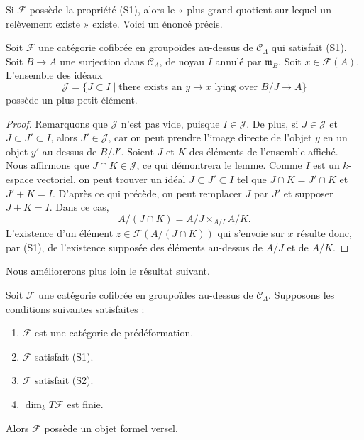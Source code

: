 \noindent
Si $\mathcal{F}$ possède la propriété (S1), alors le « plus grand quotient sur
lequel un relèvement existe » existe. Voici un énoncé précis.

\begin{lemma}
\label{lemma-largest-closed-where-lift}
Soit $\mathcal{F}$ une catégorie cofibrée en groupoïdes au-dessus de
$\mathcal{C}_\Lambda$ qui satisfait (S1). Soit $B \to A$ une surjection dans
$\mathcal{C}_\Lambda$, de noyau $I$ annulé par $\mathfrak m_B$. Soit
$x \in \mathcal{F}(A)$. L'ensemble des idéaux
$$
\mathcal{J} = \{ J \subset I \mid
\text{there exists an }y \to x\text{ lying over }B/J \to A\}
$$
possède un plus petit élément.
\end{lemma}

\begin{proof}
Remarquons que $\mathcal{J}$ n'est pas vide, puisque
$I \in \mathcal{J}$. De plus, si $J \in \mathcal{J}$ et
$J \subset J' \subset I$, alors $J' \in \mathcal{J}$, car on peut prendre
l'image directe de l'objet $y$ en un objet $y'$ au-dessus de $B/J'$. Soient
$J$ et $K$ des éléments de l'ensemble affiché. Nous affirmons que
$J \cap K \in \mathcal{J}$, ce qui démontrera le lemme. Comme $I$ est un
$k$-espace vectoriel, on peut trouver un idéal $J \subset J' \subset I$ tel
que $J \cap K = J' \cap K$ et $J' + K = I$. D'après ce qui précède, on peut
remplacer $J$ par $J'$ et supposer $J + K = I$. Dans ce cas,
$$
A/(J \cap K) = A/J \times_{A/I} A/K.
$$
L'existence d'un élément $z \in \mathcal{F}(A/(J \cap K))$ qui s'envoie sur
$x$ résulte donc, par (S1), de l'existence supposée des éléments au-dessus de
$A/J$ et de $A/K$.
\end{proof}

\noindent
Nous améliorerons plus loin le résultat suivant.

\begin{lemma}
\label{lemma-versal-object-existence}
Soit $\mathcal{F}$ une catégorie cofibrée en groupoïdes au-dessus de
$\mathcal{C}_\Lambda$. Supposons les conditions suivantes satisfaites :
\begin{enumerate}
\item $\mathcal{F}$ est une catégorie de prédéformation.
\item $\mathcal{F}$ satisfait (S1).
\item $\mathcal{F}$ satisfait (S2).
\item $\dim_k T\mathcal{F}$ est finie.
\end{enumerate}
Alors $\mathcal{F}$ possède un objet formel versel.
\end{lemma}

